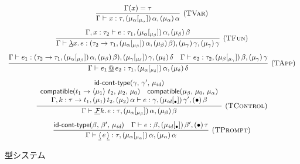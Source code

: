 \begin{figure}[h]
\[
\begin{array}{c}
\infer[\TVar]
      {\JudgeTrail{\Gamma}{x}{\tau}{\TrailsType{\alpha}{\alpha}}
                                   {\TrailType{\alpha}}}
      {\Gamma(x)=\tau}
\\[3mm]
\infer[\TFun]
      {\JudgeTrail{\Gamma}{\DLam{x}{e}}
                  {\ArrowTrailP{\tau_2}{\tau_1}
                               {\TrailsType{\alpha}{\beta}}
                               {\TrailType{\beta}}}
                  {\TrailType{\gamma}}
                  {\TrailType{\gamma}}}
      {\JudgeTrail{\Gamma,x:\tau_2}{e}{\tau_1}
                  {\TrailsType{\alpha}{\beta}}
                  {\TrailType{\beta}}}
\\[3mm]
\infer[\TApp]
      {\JudgeTrail{\Gamma}{\DApp{e_1}{e_2}}
                  {\tau_1}{\TrailsType{\alpha}{\delta}}{\TrailType{\delta}}}
      {\JudgeTrail{\Gamma}{e_1}
                  {\ArrowTrailP{\tau_2}{\tau_1}{\TrailsType{\alpha}{\beta}}
                                               {\TrailType{\beta}}}
                  {\TrailsType{\gamma}{\delta}}
                  {\TrailType{\delta}}
      &\JudgeTrail{\Gamma}{e_2}{\tau_2}{\TrailsType{\beta}{\gamma}}{\TrailType{\gamma}}}
\\[3mm]
\infer[\TControl]
      {\JudgeTrail{\Gamma}{\DControl{k}{e}}{\tau}
                  {\TrailsType{\alpha}{\beta}}
                  {\TrailType{\beta}}}
      {\begin{array}{c}
       \IsIdTrail{\gamma}{\gamma'}{\MuId}\\
       \Compatible{\Trail{t_1}{t_2}{\mu_1}}{\mu_2}{\mu_0}\quad
       \Compatible{\mu_\beta}{\mu_0}{\mu_\alpha}\\
       \JudgeTrail{\Gamma,k:\ArrowTrail{\tau}{t_1}
                              {\TType{\mu_1}{t_2}}
                              {\TType{\mu_2}{\alpha}}}
                  {e}{\gamma}
                  {\TsType{\MuId}{\gamma'}{\Bullet}}
                  {\TType{\Bullet}{\beta}}
       \end{array}}
\\[3mm]
\infer[\TPrompt]
      {\JudgeTrail{\Gamma}{\DReset{e}}{\tau}{\TrailsType{\alpha}{\alpha}}
                                            {\TrailType{\alpha}}}
      {\IsIdTrail{\beta}{\beta'}{\MuId}
      &\JudgeTrail{\Gamma}{e}{\beta}
                  {\TsType{\MuId}{\beta'}{\Bullet}}
                  {\TType{\Bullet}{\tau}}}
\end{array}
\]
\caption{型システム}
\label{TypeSystem}
\end{figure}

